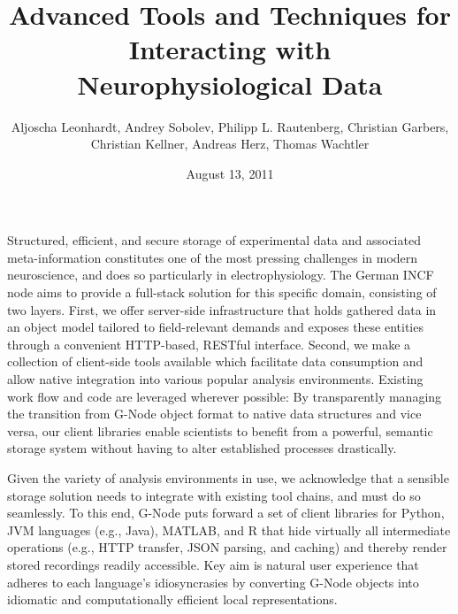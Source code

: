 \documentclass[a4paper]{article}
\begin{document}
\title{Advanced Tools and Techniques for Interacting with Neurophysiological Data}

\author{

  Aljoscha Leonhardt,
  Andrey Sobolev,
  Philipp L. Rautenberg,
  Christian Garbers,
  Christian Kellner,
  Andreas Herz,
  Thomas Wachtler

}
\date{August 13, 2011}

\maketitle


Structured, efficient, and secure storage of experimental data and
associated meta-information constitutes one of the most pressing
challenges in modern neuroscience, and does so particularly in
electrophysiology. The German INCF node aims to provide a full-stack
solution for this specific domain, consisting of two layers. First, we
offer server-side infrastructure that holds gathered data in an object
model tailored to field-relevant demands and exposes these entities
through a convenient HTTP-based, RESTful interface. Second, we make a
collection of client-side tools available which facilitate data
consumption and allow native integration into various popular analysis
environments. Existing work flow and code are leveraged wherever
possible: By transparently managing the transition from G-Node object
format to native data structures and vice versa, our client libraries
enable scientists to benefit from a powerful, semantic storage system
without having to alter established processes drastically.

Given the variety of analysis environments in use, we acknowledge that
a sensible storage solution needs to integrate with existing tool
chains, and must do so seamlessly. To this end, G-Node puts forward a
set of client libraries for Python, JVM languages (e.g., Java),
MATLAB, and R that hide virtually all intermediate operations (e.g.,
HTTP transfer, JSON parsing, and caching) and thereby render stored
recordings readily accessible. Key aim is natural user experience that
adheres to each language's idiosyncrasies by converting G-Node objects
into idiomatic and computationally efficient local representations.
\end{document}
